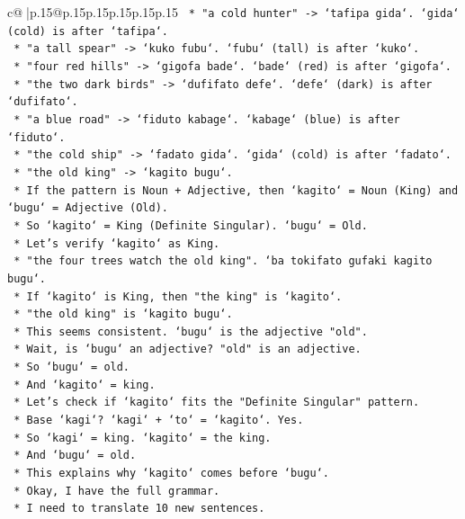 \documentclass{article}
\begin{document}
{\begin{supertabular}{c@{$\;$}|p{.15\linewidth}@{}p{.15\linewidth}p{.15\linewidth}p{.15\linewidth}p{.15\linewidth}p{.15\linewidth}}
{{{\texttt{    *   "a cold hunter" {-}> `tafipa gida`. `gida` (cold) is after `tafipa`.} \\
\texttt{    *   "a tall spear" {-}> `kuko fubu`. `fubu` (tall) is after `kuko`.} \\
\texttt{    *   "four red hills" {-}> `gigofa bade`. `bade` (red) is after `gigofa`.} \\
\texttt{    *   "the two dark birds" {-}> `dufifato defe`. `defe` (dark) is after `dufifato`.} \\
\texttt{    *   "a blue road" {-}> `fiduto kabage`. `kabage` (blue) is after `fiduto`.} \\
\texttt{    *   "the cold ship" {-}> `fadato gida`. `gida` (cold) is after `fadato`.} \\
\texttt{    *   "the old king" {-}> `kagito bugu`.} \\
\texttt{    *   If the pattern is Noun + Adjective, then `kagito` = Noun (King) and `bugu` = Adjective (Old).} \\
\texttt{    *   So `kagito` = King (Definite Singular). `bugu` = Old.} \\
\texttt{    *   Let's verify `kagito` as King.} \\
\texttt{    *   "the four trees watch the old king". `ba tokifato gufaki kagito bugu`.} \\
\texttt{    *   If `kagito` is King, then "the king" is `kagito`.} \\
\texttt{    *   "the old king" is `kagito bugu`.} \\
\texttt{    *   This seems consistent. `bugu` is the adjective "old".} \\
\texttt{    *   Wait, is `bugu` an adjective? "old" is an adjective.} \\
\texttt{    *   So `bugu` = old.} \\
\texttt{    *   And `kagito` = king.} \\
\texttt{    *   Let's check if `kagito` fits the "Definite Singular" pattern.} \\
\texttt{    *   Base `kagi`? `kagi` + `to` = `kagito`. Yes.} \\
\texttt{    *   So `kagi` = king. `kagito` = the king.} \\
\texttt{    *   And `bugu` = old.} \\
\texttt{    *   This explains why `kagito` comes before `bugu`.} \\
\texttt{    *   Okay, I have the full grammar.} \\
\texttt{    *   I need to translate 10 new sentences.} \\
}}}
\end{supertabular}}
\end{document}
